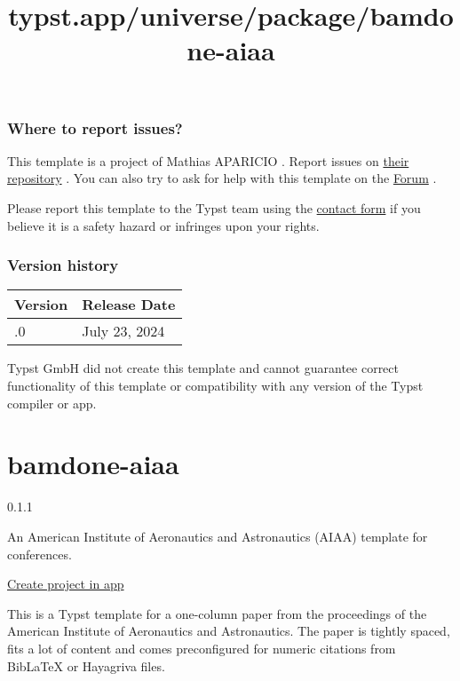 \subsubsection{Where to report issues?}\label{where-to-report-issues}

This template is a project of Mathias APARICIO . Report issues on
\href{https://github.com/mathias-aparicio/simple-preavis}{their
repository} . You can also try to ask for help with this template on the
\href{https://forum.typst.app}{Forum} .

Please report this template to the Typst team using the
\href{https://typst.app/contact}{contact form} if you believe it is a
safety hazard or infringes upon your rights.

\label{versions}
\subsubsection{Version history}\label{version-history}

\begin{longtable}[]{@{}ll@{}}
\toprule\noalign{}
Version & Release Date \\
\midrule\noalign{}
\endhead
\bottomrule\noalign{}
\endlastfoot
0.1.0 & July 23, 2024 \\
\end{longtable}

Typst GmbH did not create this template and cannot guarantee correct
functionality of this template or compatibility with any version of the
Typst compiler or app.


\title{typst.app/universe/package/bamdone-aiaa}

\label{banner}
\label{template-thumbnail}

\section{bamdone-aiaa}\label{bamdone-aiaa}

{ 0.1.1 }

An American Institute of Aeronautics and Astronautics (AIAA) template
for conferences.

\href{/app?template=bamdone-aiaa&version=0.1.1}{Create project in app}

\label{readme}
This is a Typst template for a one-column paper from the proceedings of
the American Institute of Aeronautics and Astronautics. The paper is
tightly spaced, fits a lot of content and comes preconfigured for
numeric citations from BibLaTeX or Hayagriva files.

